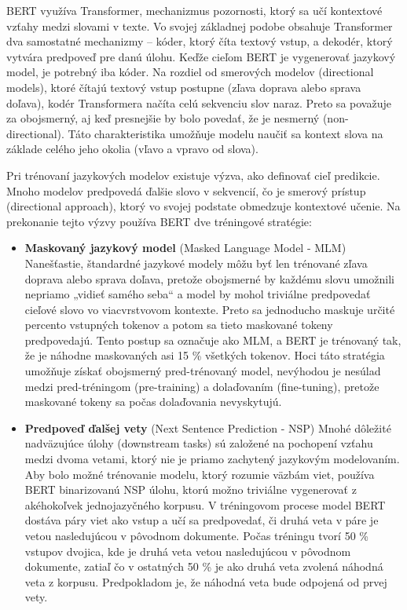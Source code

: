 BERT využíva Transformer, mechanizmus pozornosti, ktorý sa učí kontextové vzťahy medzi slovami  v texte. Vo svojej základnej podobe obsahuje Transformer dva samostatné mechanizmy – kóder, ktorý číta textový vstup, a dekodér, ktorý vytvára predpoveď pre danú úlohu. Keďže cieľom BERT je vygenerovať jazykový model, je potrebný iba kóder. Na rozdiel od smerových modelov (directional models), ktoré čítajú textový vstup postupne (zľava doprava alebo sprava doľava), kodér Transformera načíta celú sekvenciu slov naraz. Preto sa považuje za obojsmerný, aj keď presnejšie by bolo povedať, že je nesmerný (non-directional). Táto charakteristika umožňuje modelu naučiť sa kontext slova na základe celého jeho okolia (vľavo a vpravo od slova).

Pri trénovaní jazykových modelov existuje výzva, ako definovať cieľ predikcie. Mnoho modelov predpovedá ďalšie slovo v sekvencií, čo je smerový prístup (directional approach), ktorý vo svojej podstate obmedzuje kontextové učenie. Na prekonanie tejto výzvy používa BERT dve tréningové stratégie:
\begin{itemize}
    \item \textbf{Maskovaný jazykový model}  (Masked Language Model - MLM)  Nanešťastie, štandardné  jazykové modely môžu byť len trénované zľava doprava alebo sprava doľava, pretože obojsmerné by každému slovu umožnili nepriamo „vidieť samého seba“ a model by mohol triviálne predpovedať cieľové slovo vo viacvrstvovom kontexte. Preto sa jednoducho maskuje určité percento vstupných tokenov a potom sa tieto maskované tokeny predpovedajú. Tento postup sa označuje ako MLM, a BERT je trénovaný tak, že je náhodne maskovaných asi 15 \% všetkých tokenov. Hoci táto stratégia umožňuje získať obojsmerný pred-trénovaný model, nevýhodou je nesúlad medzi pred-tréningom (pre-training) a dolaďovaním (fine-tuning), pretože maskované tokeny sa počas dolaďovania nevyskytujú.
    
    \item \textbf{Predpoveď ďalšej vety} (Next Sentence Prediction - NSP) Mnohé dôležité nadväzujúce úlohy (downstream tasks) sú založené na pochopení vzťahu medzi dvoma vetami, ktorý nie je priamo zachytený jazykovým modelovaním. Aby bolo možné trénovanie modelu, ktorý rozumie väzbám viet, používa BERT binarizovanú NSP úlohu, ktorú možno triviálne vygenerovať z akéhokoľvek jednojazyčného korpusu. V tréningovom procese model BERT dostáva páry viet ako vstup a učí sa predpovedať, či druhá veta v páre je vetou nasledujúcou v pôvodnom dokumente. Počas tréningu tvorí 50 \% vstupov dvojica, kde je druhá veta vetou nasledujúcou v pôvodnom dokumente, zatiaľ čo v ostatných 50 \% je ako druhá veta zvolená náhodná veta z korpusu. Predpokladom je, že náhodná veta bude odpojená od prvej vety.
\end{itemize}

